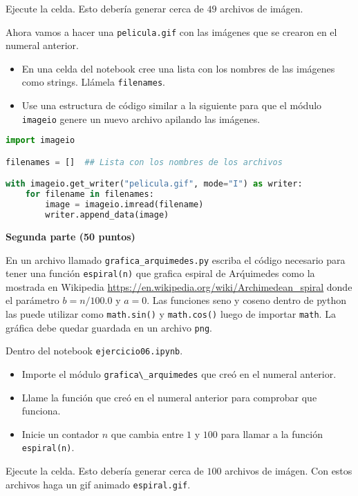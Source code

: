 \documentclass{article}
\begin{document}
Ejecute la celda. Esto debería generar cerca de $49$ archivos de imágen. 


Ahora vamos a hacer una \verb"pelicula.gif" con las imágenes que se
crearon en el numeral anterior. 

\begin{itemize}
\item En una celda del notebook cree una lista con los nombres de las
  imágenes como strings. 
Llámela  \verb"filenames".
\item Use una estructura de código similar a la siguiente para que el
  módulo \verb"imageio" genere un nuevo archivo apilando las imágenes.
\end{itemize}



\begin{lstlisting}[language=Python, caption=gif animado]
import imageio

filenames = []  ## Lista con los nombres de los archivos

with imageio.get_writer("pelicula.gif", mode="I") as writer:
    for filename in filenames:
        image = imageio.imread(filename)
        writer.append_data(image)
\end{lstlisting}


\textbf{Segunda parte (50 puntos)}

En un archivo llamado \verb"grafica_arquimedes.py" escriba el c\'odigo 
necesario para tener una funci\'on \verb"espiral(n)" que grafica espiral de Ar\'quimedes como la mostrada 
en Wikipedia \url{https://en.wikipedia.org/wiki/Archimedean_spiral} donde el par\'ametro
$b=n/100.0$ y $a=0$.
Las funciones seno y coseno dentro de python las puede utilizar como \verb"math.sin()" y \verb"math.cos()"
luego de importar \verb"math".
La gr\'afica debe quedar guardada en un archivo \verb"png".

Dentro del notebook \verb"ejercicio06.ipynb".

\begin{itemize}
    \item Importe el módulo \verb"grafica\_arquimedes" que creó en el numeral anterior.
    \item Llame la función que creó en el numeral anterior para comprobar que funciona.
    \item Inicie un contador $n$ que cambia entre $1$ y $100$ para llamar a la funci\'on
      \verb"espiral(n)".
\end{itemize}
 
Ejecute la celda. Esto debería generar cerca de $100$ archivos de imágen. 
Con estos archivos haga un gif animado \verb"espiral.gif".
\end{document}
